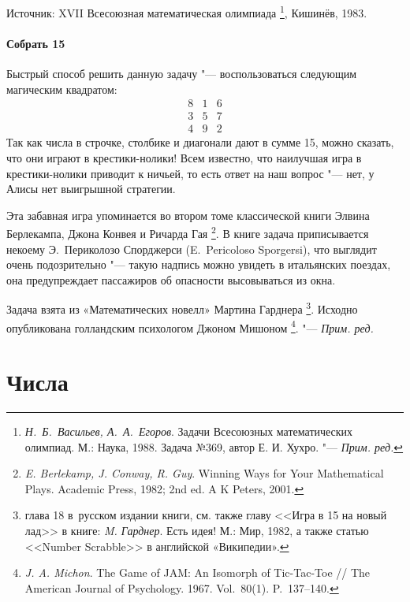 \documentclass[twoside]{book}
\newcommand\VsMO{\emph{Н.~Б.~Васильев, А.~А.~Егоров}. Задачи Всесоюзных математических олимпиад. М.: Наука, 1988}
\newenvironment{addedbytheeditors}{\par\medskip\small
}{\par\addvspace{\medskipamount}} %
\begin{document}

{%


Источник:
XVII Всесоюзная математическая олимпиада%
\footnote{%
\VsMO. Задача №369, автор  Е. И. Хухро. "--- \emph{Прим. ред.}}, Кишинёв, 1983.

}

\subsubsection*{Собрать 15} %

Быстрый способ решить данную задачу "--- воспользоваться следующим магическим квадратом:
$$
\begin{matrix}
8&1&6\\
3&5&7\\
4&9&2
\end{matrix}
$$
Так как числа в строчке, столбике и диагонали дают в сумме 15, можно сказать, что они играют в крестики-нолики! 
Всем известно, что наилучшая игра в крестики-нолики приводит к ничьей,
то есть ответ на наш вопрос "--- нет, у Алисы нет выигрышной стратегии.
\heart

\medskip
Эта забавная игра упоминается во втором томе классической книги Элвина Берлекампа, Джона Конвея и Ричарда Гая%
\footnote{\emph{E. Berlekamp, J. Conway, R. Guy}. {Winning Ways for Your Mathematical Plays.} Academic Press, 1982; 2nd ed. A K Peters, 2001.}.
В книге задача приписывается некоему Э.~Периколозо Спорджерси
(E.~Pe\-ri\-coloso Sporgersi), что выглядит очень подозрительно "---
такую надпись можно увидеть в итальянских поездах, она предупреждает
пассажиров об опасности высовываться из окна. 

\begin{addedbytheeditors}
Задача взята из «Математических новелл» Мартина Гарднера \footnote{глава 18 в~русском издании книги, см. также главу <<{Игра в 15 на новый   лад}>> в книге: \emph{M. Гарднер}. Есть идея! М.: Мир, 1982, а также статью <<Number Scrabble>> в английской «Википедии».}.
Исходно опубликована голландским психологом Джоном Мишоном%
\footnote{\emph{J. A. Michon}. The Game of JAM: An Isomorph of Tic-Tac-Toe /\!/ The American Journal of Psychology. 1967. Vol.~80(1). P.~137--140.}.
"--- \emph{Прим. ред.}
\end{addedbytheeditors}




\chapter{Числа}
\end{document}
